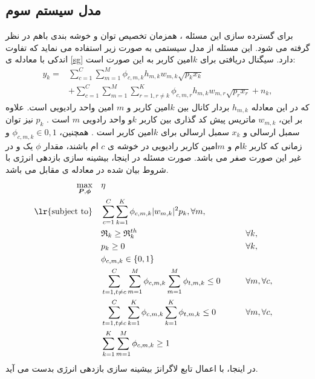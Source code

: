 \subsection{مدل سیستم سوم}
برای گسترده سازی این مسئله ، همزمان تخصیص توان و خوشه بندی باهم در نظر گرفته می شود.
این مسئله از مدل سیستمی به صورت زیر استفاده می نماید که تفاوت اندکی با معادله ی \eqref{sg} دارد.
سیگنال دریافتی برای $k$امین کاربر به این صورت است:
\begin{equation} \label{sg1}
\begin{aligned}
y_{k} =& \sum_{c=1}^C \sum_{m=1}^M  \phi_{c,m,k}h_{m,k}w_{m,k} \sqrt{p_k x_k} \\
&+ \sum_{c=1}^C \sum_{m=1}^M \sum_{r=1 ,r \neq k}^K  \phi_{c,m,r}h_{m,k}w_{m,r} \sqrt{p_r x_r} + n_k,
\end{aligned}	
\end{equation}
که در این معادله  $h_{m,k}$  بردار کانال بین $k$امین کاربر و $m$ امین  واحد رادیویی است.
علاوه بر این، $w_{m,k}$ ماتریس پیش کد گذاری بین کاربر $k$و واحد رادویی $m$ است . 
$p_k$ 
نیز توان سمبل ارسالی و
$x_k$
سمبل ارسالی برای $k$امین کاربر است .
همچنین، 
$ \phi_{c,m,k} \in {0,1}$ 
و زمانی که کاربر $k$ام و  $m$امین کاربر رادیویی در خوشه ی $c$ ام باشند، مقدار $\phi$ یک و در غیر این صورت صفر می باشد.
صورت مسئله در اینجا، بیشینه سازی بازدهی انرژی با شروط بیان شده در معادله ی  مقابل می باشد.
\begin{equation}
\begin{aligned}
\max\limits_{\boldsymbol{P},\boldsymbol{\phi}}   \quad &   \eta\\
\text{\lr{subject to}} \quad  & \sum_{c=1}^C \sum_{k=1}^K  \phi_{c,m,k}|w_{m,k}|^2 p_k , \forall m,   \\
&\mathfrak{R}_{k} \geq  \mathfrak{R}_{k}^{th} && \qquad  \forall k, \\
&p_{k}  \geq 0                                  &&\qquad  \forall k, \\
& \phi_{c,m,k} \in \{0,1\} \\
 &\sum_{t=1, t \neq c}^C \sum_{m=1}^M  \phi_{c,m,k}\sum_{m=1}^M \phi_{t,m,k} \leq 0    &&\qquad    \forall m  , \forall c, \\
  &\sum_{t=1, t \neq c}^C \sum_{k=1}^K  \phi_{c,m,k}\sum_{k=1}^K \phi_{t,m,k} \leq 0      &&\qquad      \forall m  , \forall c,\\
  &\sum_{k=1}^K \sum_{m=1}^M  \phi_{c,m,k} \geq 1\\
\end{aligned}	
\end{equation}
در اینجا، با اعمال تابع لاگرانژ بیشینه سازی بازدهی انرژی بدست می آید\cite{jointcluster,pcluster, jue}.
